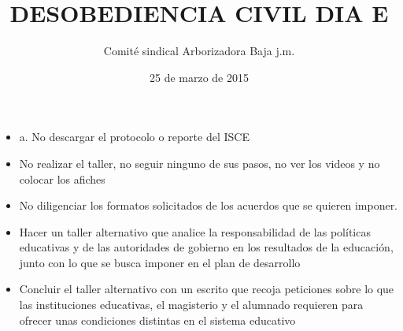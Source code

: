 \documentclass[10pt,letterpaper]{article}
\author{Comité sindical Arborizadora Baja j.m.}
\title{DESOBEDIENCIA CIVIL DIA E}
\date{25 de marzo de 2015}
\begin{document}
\maketitle
\begin{itemize}
\item a. No descargar el protocolo o reporte del ISCE
\item No realizar el taller, no seguir ninguno de sus pasos, no ver los videos y no colocar los afiches
\item No diligenciar los formatos solicitados de los acuerdos que se quieren imponer.
\item Hacer un taller alternativo que analice la responsabilidad de las políticas educativas y de las autoridades de gobierno en los resultados de la educación, junto con lo que se busca imponer en el plan de desarrollo
\item Concluir el taller alternativo con un escrito que recoja peticiones sobre lo que las instituciones educativas, el magisterio y el alumnado requieren para ofrecer unas condiciones distintas en el sistema educativo
\end{itemize}
\end{document}
